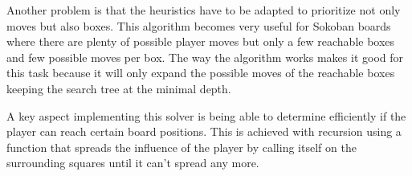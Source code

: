 Another problem is that the heuristics have to be adapted to prioritize not only moves but also boxes. This algorithm becomes very useful for Sokoban boards where there are plenty of possible player moves but only a few reachable boxes and few possible moves per box.
The way the algorithm works makes it good for this task because it will only expand the possible moves of the reachable boxes keeping the search tree at the minimal depth.

A key aspect implementing this solver is being able to determine efficiently if the player can reach certain board positions. This is achieved with recursion using a function that spreads the influence of the player by calling itself on the surrounding squares until it can't spread any more.